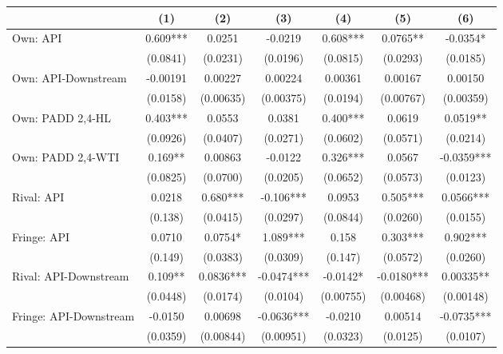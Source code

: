 {
\def\sym#1{\ifmmode^{#1}\else\(^{#1}\)\fi}
\begin{tabular}{l*{6}{c}}
\toprule
                &\multicolumn{1}{c}{(1)}   &\multicolumn{1}{c}{(2)}   &\multicolumn{1}{c}{(3)}   &\multicolumn{1}{c}{(4)}   &\multicolumn{1}{c}{(5)}   &\multicolumn{1}{c}{(6)}   \\
\midrule
Own: API        &    0.609***&   0.0251   &  -0.0219   &    0.608***&   0.0765** &  -0.0354*  \\
                & (0.0841)   & (0.0231)   & (0.0196)   & (0.0815)   & (0.0293)   & (0.0185)   \\
\addlinespace
Own: API-Downstream& -0.00191   &  0.00227   &  0.00224   &  0.00361   &  0.00167   &  0.00150   \\
                & (0.0158)   &(0.00635)   &(0.00375)   & (0.0194)   &(0.00767)   &(0.00359)   \\
\addlinespace
Own: PADD 2,4-HL&    0.403***&   0.0553   &   0.0381   &    0.400***&   0.0619   &   0.0519** \\
                & (0.0926)   & (0.0407)   & (0.0271)   & (0.0602)   & (0.0571)   & (0.0214)   \\
\addlinespace
Own: PADD 2,4-WTI&    0.169** &  0.00863   &  -0.0122   &    0.326***&   0.0567   &  -0.0359***\\
                & (0.0825)   & (0.0700)   & (0.0205)   & (0.0652)   & (0.0573)   & (0.0123)   \\
\addlinespace
Rival: API      &   0.0218   &    0.680***&   -0.106***&   0.0953   &    0.505***&   0.0566***\\
                &  (0.138)   & (0.0415)   & (0.0297)   & (0.0844)   & (0.0260)   & (0.0155)   \\
\addlinespace
Fringe: API     &   0.0710   &   0.0754*  &    1.089***&    0.158   &    0.303***&    0.902***\\
                &  (0.149)   & (0.0383)   & (0.0309)   &  (0.147)   & (0.0572)   & (0.0260)   \\
\addlinespace
Rival: API-Downstream&    0.109** &   0.0836***&  -0.0474***&  -0.0142*  &  -0.0180***&  0.00335** \\
                & (0.0448)   & (0.0174)   & (0.0104)   &(0.00755)   &(0.00468)   &(0.00148)   \\
\addlinespace
Fringe: API-Downstream&  -0.0150   &  0.00698   &  -0.0636***&  -0.0210   &  0.00514   &  -0.0735***\\
                & (0.0359)   &(0.00844)   &(0.00951)   & (0.0323)   & (0.0125)   & (0.0107)   \\

\end{tabular}}
